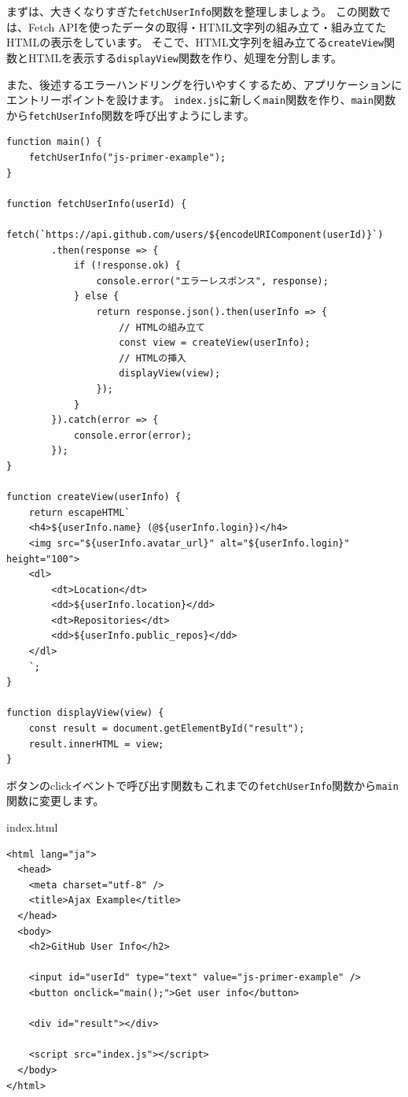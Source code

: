 まずは、大きくなりすぎた\texttt{fetchUserInfo}関数を整理しましょう。
この関数では、Fetch
APIを使ったデータの取得・HTML文字列の組み立て・組み立てたHTMLの表示をしています。
そこで、HTML文字列を組み立てる\texttt{createView}関数とHTMLを表示する\texttt{displayView}関数を作り、処理を分割します。

また、後述するエラーハンドリングを行いやすくするため、アプリケーションにエントリーポイントを設けます。
\texttt{index.js}に新しく\texttt{main}関数を作り、\texttt{main}関数から\texttt{fetchUserInfo}関数を呼び出すようにします。

\begin{lstlisting}
function main() {
    fetchUserInfo("js-primer-example");
}

function fetchUserInfo(userId) {
    fetch(`https://api.github.com/users/${encodeURIComponent(userId)}`)
        .then(response => {
            if (!response.ok) {
                console.error("エラーレスポンス", response);
            } else {
                return response.json().then(userInfo => {
                    // HTMLの組み立て
                    const view = createView(userInfo);
                    // HTMLの挿入
                    displayView(view);
                });
            }
        }).catch(error => {
            console.error(error);
        });
}

function createView(userInfo) {
    return escapeHTML`
    <h4>${userInfo.name} (@${userInfo.login})</h4>
    <img src="${userInfo.avatar_url}" alt="${userInfo.login}" height="100">
    <dl>
        <dt>Location</dt>
        <dd>${userInfo.location}</dd>
        <dt>Repositories</dt>
        <dd>${userInfo.public_repos}</dd>
    </dl>
    `;
}

function displayView(view) {
    const result = document.getElementById("result");
    result.innerHTML = view;
}
\end{lstlisting}

ボタンのclickイベントで呼び出す関数もこれまでの\texttt{fetchUserInfo}関数から\texttt{main}関数に変更します。

\begin{listtitle}
index.html
\end{listtitle}
\begin{lstlisting}
<html lang="ja">
  <head>
    <meta charset="utf-8" />
    <title>Ajax Example</title>
  </head>
  <body>
    <h2>GitHub User Info</h2>

    <input id="userId" type="text" value="js-primer-example" />
    <button onclick="main();">Get user info</button>

    <div id="result"></div>

    <script src="index.js"></script>
  </body>
</html>
\end{lstlisting}
\listend

